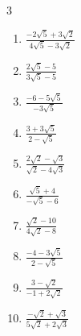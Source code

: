 \begin{multicols}{3}
\begin{enumerate}
        \phantom{$\displaystyle =1$}

  \item $\displaystyle \frac{-2\sqrt{5}+3\sqrt{2}}{4\sqrt{5}-3\sqrt{2}}$


  \item $\displaystyle \frac{2\sqrt{5}-5}{3\sqrt{5}-5}$


  \item $\displaystyle \frac{-6-5\sqrt{5}}{-3\sqrt{5}}$


\columnbreak %

\resetques

  \item $\displaystyle \frac{3+3\sqrt{5}}{2-\sqrt{5}}$


  \item $\displaystyle \frac{2\sqrt{2}-\sqrt{3}}{\sqrt{2}-4\sqrt{3}}$


  \item $\displaystyle \frac{\sqrt{5}+4}{-\sqrt{5}-6}$


  \item $\displaystyle \frac{\sqrt{2}-10}{4\sqrt{2}-8}$


  \item $\displaystyle \frac{-4-3\sqrt{5}}{2-\sqrt{5}}$


\columnbreak %

  \item $\displaystyle \frac{3-\sqrt{2}}{-1+2\sqrt{2}}$


  \item $\displaystyle \frac{-\sqrt{2}+\sqrt{3}}{5\sqrt{2}+2\sqrt{3}}$



\end{enumerate}
\end{multicols}
